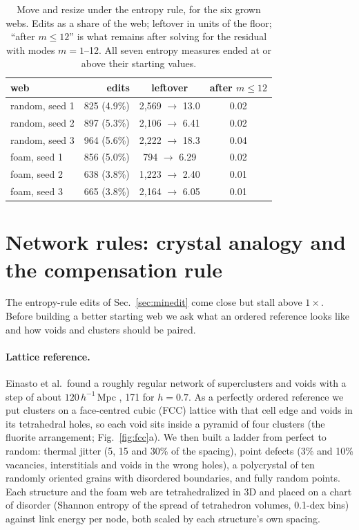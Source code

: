 \documentclass[aps,prd,twocolumn,nofootinbib,superscriptaddress,floatfix]{revtex4-2}
\begin{document}
\begin{table}[tbp]
\caption{Move and resize under the entropy rule, for the six grown webs. Edits as a share of the web; leftover in units of the floor; ``after $m\leq12$'' is what remains after solving for the residual with modes $m=1$--12. All seven entropy measures ended at or above their starting values.}
\label{tab:entropy}
\footnotesize
\begin{ruledtabular}
\begin{tabular}{lrcc}
web & edits & leftover & after $m\leq12$\\
\midrule
random, seed 1 & 825 (4.9\%) & 2,569 $\to$ 13.0 & 0.02\\
random, seed 2 & 897 (5.3\%) & 2,106 $\to$ 6.41 & 0.02\\
random, seed 3 & 964 (5.6\%) & 2,222 $\to$ 18.3 & 0.04\\
foam, seed 1 & 856 (5.0\%) & 794 $\to$ 6.29 & 0.02\\
foam, seed 2 & 638 (3.8\%) & 1,223 $\to$ 2.40 & 0.01\\
foam, seed 3 & 665 (3.8\%) & 2,164 $\to$ 6.05 & 0.01\\
\end{tabular}
\end{ruledtabular}
\end{table}

\section{Network rules: crystal analogy and the compensation rule}\label{sec:crystal}
The entropy-rule edits of Sec.~\ref{sec:minedit} come close but stall above $1\times$. Before building a better starting web we ask what an ordered reference looks like and how voids and clusters should be paired.

\paragraph*{Lattice reference.} Einasto et al.\ found a roughly regular network of superclusters and voids with a step of about $120\,h^{-1}$\,Mpc \cite{Einasto1997Nature,Einasto1997II}, \SI{171}{\Mpc} for $h=0.7$. As a perfectly ordered reference we put clusters on a face-centred cubic (FCC) lattice with that cell edge and voids in its tetrahedral holes, so each void sits inside a pyramid of four clusters (the fluorite arrangement; Fig.~\ref{fig:fcc}a). We then built a ladder from perfect to random: thermal jitter (5, 15 and 30\% of the spacing), point defects (3\% and 10\% vacancies, interstitials and voids in the wrong holes), a polycrystal of ten randomly oriented grains with disordered boundaries, and fully random points. Each structure and the foam web are tetrahedralized in 3D and placed on a chart of disorder (Shannon entropy of the spread of tetrahedron volumes, 0.1-dex bins) against link energy per node, both scaled by each structure's own spacing.
\end{document}
